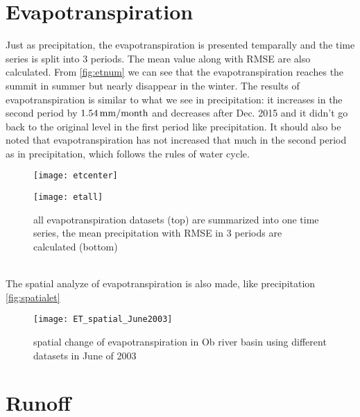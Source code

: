 \section{Evapotranspiration}
Just as precipitation, the evapotranspiration is presented temparally and the time series is split into 3 periods. The mean value along with RMSE are also calculated. From \autoref{fig:etnum} we can see that the evapotranspiration reaches the summit in summer but nearly disappear in the winter. The results of evapotranspiration is similar to what we see in precipitation: it increases in the second period by $1.54 \,\mathrm{mm/month}$ and decreases after Dec. 2015 and it didn't go back to the original level in the first period like precipitation. It should also be noted that evapotranspiration has not increased that much in the second period as in precipitation, which follows the rules of water cycle.
\begin{figure}[htbp]\centering
	\begin{minipage}[t]{0.9\textwidth}
		\centering
		\texttt{[image: etcenter]} %
	\end{minipage}
	\begin{minipage}[t]{0.9\textwidth}
		\centering
		\texttt{[image: etall]} %
	\end{minipage}
	\caption{all evapotranspiration datasets (top) are summarized into one time series, the mean precipitation with RMSE in 3 periods are calculated (bottom)}
	\label{fig:etnum}
\end{figure}\\
The spatial analyze of evapotranspiration is also made, like precipitation \autoref{fig:spatialet}
\begin{figure}[htbp]\centering
	\centering
	\texttt{[image: ET\_spatial\_June2003]} %
	\caption{spatial change of evapotranspiration in Ob river basin using different datasets in June of 2003} 
	\label{fig:spatialet}
\end{figure}
\clearpage
\section{Runoff}
